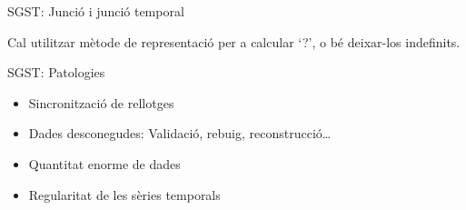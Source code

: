 \begin{frame}{SGST: Junció i junció temporal }
\begin{center}
  \end{center}
  
Cal utilitzar mètode de representació per a calcular `?', o bé deixar-los indefinits.

\end{frame}


\begin{frame}{SGST: Patologies}


  \begin{itemize}

    \item Sincronització de rellotges \parencite{kopetz11:realtime}
    \item Dades desconegudes: Validació, rebuig, reconstrucció\dots
    \item Quantitat enorme de dades
    \item Regularitat de les sèries temporals
  \end{itemize}
  

\end{frame}




